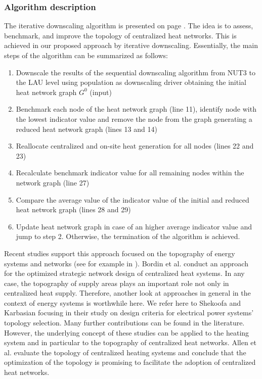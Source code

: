 \subsubsection{Algorithm description}
The iterative downscaling algorithm is presented on page \pageref{Alg:2}. The idea is to assess, benchmark, and improve the topology of centralized heat networks. This is achieved in our proposed approach by iterative downscaling. Essentially, the main steps of the algorithm can be summarized as follows:

\begin{enumerate}[nolistsep]
	\item Downscale the results of the sequential downscaling algorithm from NUT3 to the LAU level using population as downscaling driver obtaining the initial heat network graph $G^{0}$ (input)
	\item Benchmark each node of the heat network graph (line 11), identify node with the lowest indicator value and remove the node from the graph generating a reduced heat network graph (lines 13 and 14)
	\item Reallocate centralized and on-site heat generation for all nodes (lines 22 and 23)
	\item Recalculate benchmark indicator value for all remaining nodes within the network graph (line 27)
	\item Compare the average value of the indicator value of the initial and reduced heat network graph (lines 28 and 29)
	\item Update heat network graph in case of an higher average indicator value and jump to step 2. Otherwise, the termination of the algorithm is achieved. 
\end{enumerate}
\vspace{0.5cm}

Recent studies support this approach focused on the topography of energy systems and networks (see for example in \cite{abuelnasr2018examining}). Bordin et al. \cite{bordin2016optimization} conduct an approach for the optimized strategic network design of centralized heat systems. In any case, the topography of supply areas plays an important role not only in centralized heat supply. Therefore, another look at approaches in general in the context of energy systems is worthwhile here. We refer here to Shekoofa and Karbasian \cite{shekoofa2013design} focusing in their study on design criteria for electrical power systems' topology selection. Many further contributions can be found in the literature. However, the underlying concept of these studies can be applied to the heating system and in particular to the topography of centralized heat networks. Allen et al. \cite{allen2020evaluation} evaluate the topology of centralized heating systems and conclude that the optimization of the topology is promising to facilitate the adoption of centralized heat networks. 

